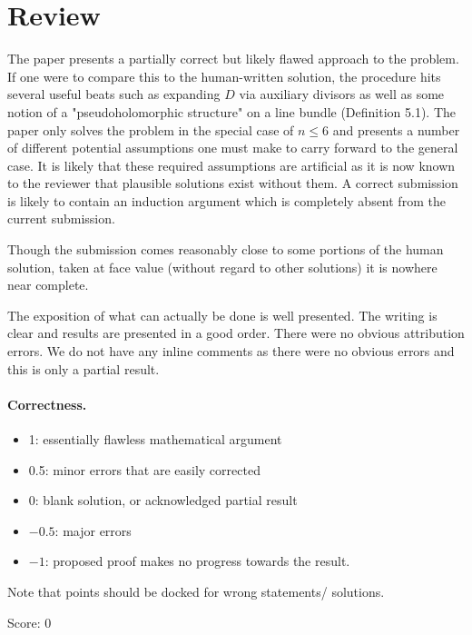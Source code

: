 \documentclass[11pt]{article}
\theoremstyle{definition}
\theoremstyle{remark}
\begin{document}
\maketitle

\section{Review}
The paper presents a partially correct but likely flawed approach to the problem. If one were to compare this to the human-written solution, the procedure hits several useful beats such as expanding $D$ via auxiliary divisors as well as some notion of a "pseudoholomorphic structure" on a line bundle (Definition 5.1). The paper only solves the problem in the special case of $n\le 6$ and presents a number of different potential assumptions one must make to carry forward to the general case. It is likely that these required assumptions are artificial as it is now known to the reviewer that plausible solutions exist without them. A correct submission is likely to contain an induction argument which is completely absent from the current submission.

Though the submission comes reasonably close to some portions of the human solution, taken at face value (without regard to other solutions) it is nowhere near complete. 

The exposition of what can actually be done is well presented. The writing is clear and results are presented in a good order. There were no obvious attribution errors. We do not have any inline comments as there were no obvious errors and this is only a partial result.

\paragraph{Correctness.}
\begin{itemize}
	\item  1: essentially flawless mathematical argument
	\item  0.5: minor errors that are easily corrected
	\item  0: blank solution, or acknowledged partial result
	\item  $-0.5$: major errors
	\item  $-1$: proposed proof makes no progress towards the result.
\end{itemize}
Note that points should be docked for wrong statements/ solutions.

\noindent Score: 0
\end{document}
